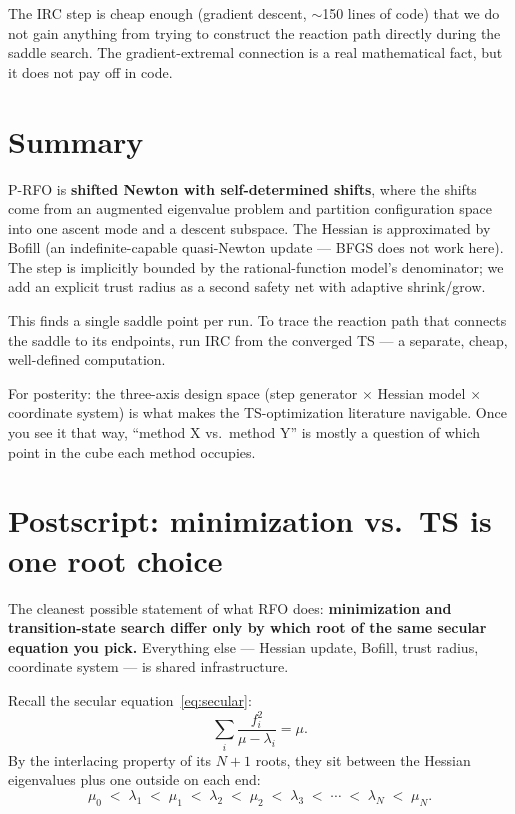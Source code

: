 \documentclass[11pt]{article}
\begin{document}
The IRC step is cheap enough (gradient descent, $\sim$150 lines of code) that
we do not gain anything from trying to construct the reaction path directly
during the saddle search.  The gradient-extremal connection is a real
mathematical fact, but it does not pay off in code.

\section{Summary}

P-RFO is \textbf{shifted Newton with self-determined shifts}, where the shifts
come from an augmented eigenvalue problem and partition configuration space
into one ascent mode and a descent subspace.  The Hessian is approximated by
Bofill (an indefinite-capable quasi-Newton update --- BFGS does not work here).
The step is implicitly bounded by the rational-function model's denominator;
we add an explicit trust radius as a second safety net with adaptive
shrink/grow.

This finds a single saddle point per run.  To trace the reaction path that
connects the saddle to its endpoints, run IRC from the converged TS --- a
separate, cheap, well-defined computation.

For posterity: the three-axis design space (step generator $\times$ Hessian
model $\times$ coordinate system) is what makes the TS-optimization literature
navigable.  Once you see it that way, ``method X vs.\ method Y'' is mostly a
question of which point in the cube each method occupies.

\section{Postscript: minimization vs.\ TS is one root choice}

The cleanest possible statement of what RFO does: \textbf{minimization and
transition-state search differ only by which root of the same secular equation
you pick.}  Everything else --- Hessian update, Bofill, trust radius,
coordinate system --- is shared infrastructure.

Recall the secular equation~\eqref{eq:secular}:
\begin{equation*}
  \sum_i \frac{f_i^2}{\mu - \lambda_i} = \mu.
\end{equation*}
By the interlacing property of its $N+1$ roots, they sit between the Hessian
eigenvalues plus one outside on each end:
\begin{equation*}
  \mu_0 \;<\; \lambda_1 \;<\; \mu_1 \;<\; \lambda_2 \;<\; \mu_2 \;<\; \lambda_3
  \;<\; \cdots \;<\; \lambda_N \;<\; \mu_N.
\end{equation*}
\end{document}
